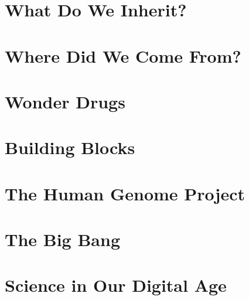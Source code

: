 \documentclass[a4paper,12pt]{article}
\begin{document}
\section{What Do We Inherit?} %

\section{Where Did We Come From?} %

\section{Wonder Drugs} %

\section{Building Blocks} %

\section{The Human Genome Project} %

\section{The Big Bang} %

\section{Science in Our Digital Age } %
\end{document}

